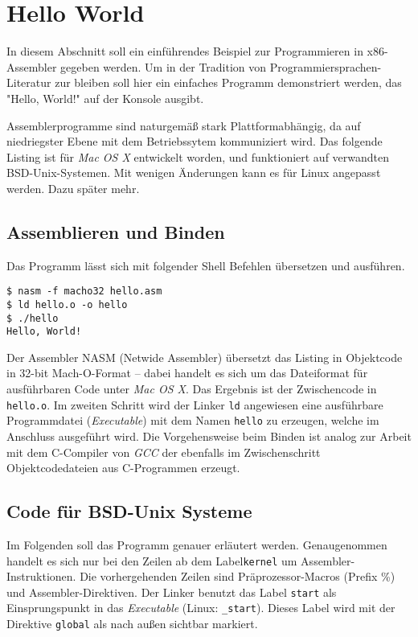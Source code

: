\section{Hello World}

In diesem Abschnitt soll ein einführendes Beispiel zur Programmieren in x86-Assembler gegeben werden. Um in der Tradition von Programmiersprachen-Literatur zur bleiben soll hier ein einfaches Programm demonstriert werden, das "Hello, World!" auf der Konsole ausgibt.

Assemblerprogramme sind naturgemäß stark Plattformabhängig, da auf niedriegster Ebene mit dem Betriebssytem kommuniziert wird.
Das folgende Listing ist für \emph{Mac OS X} entwickelt worden, und 
funktioniert auf verwandten BSD-Unix-Systemen. Mit wenigen Änderungen kann es für Linux angepasst werden. Dazu später mehr.

\subsection{Assemblieren und Binden}

Das Programm lässt sich mit folgender Shell Befehlen übersetzen und ausführen.

\begin{lstlisting}[caption=Assemblieren und Binden von hello.asm]
$ nasm -f macho32 hello.asm
$ ld hello.o -o hello
$ ./hello
Hello, World!
\end{lstlisting}

Der Assembler NASM (Netwide Assembler) übersetzt das Listing in Objektcode in 32-bit Mach-O-Format – dabei handelt es sich um das Dateiformat für ausführbaren Code unter \emph{Mac OS X}. Das Ergebnis ist der Zwischencode in \texttt{hello.o}. Im zweiten Schritt wird der Linker \texttt{ld} angewiesen eine ausführbare Programmdatei (\emph{Executable}) mit dem Namen \texttt{hello} zu erzeugen, welche im Anschluss ausgeführt wird. Die Vorgehensweise beim Binden ist analog zur Arbeit mit dem C-Compiler von \emph{GCC} der ebenfalls im Zwischenschritt Objektcodedateien aus C-Programmen erzeugt.

\subsection{Code für BSD-Unix Systeme}

Im Folgenden soll das Programm genauer erläutert werden. Genaugenommen handelt es sich nur bei den Zeilen ab dem Label\texttt{kernel} um Assembler-Instruktionen. Die vorhergehenden Zeilen sind Präprozessor-Macros (Prefix \%) und Assembler-Direktiven. Der Linker benutzt das Label {\tt start} als Einsprungspunkt in das \emph{Executable} (Linux: {\tt \_start}).
Dieses Label wird mit der Direktive {\tt global} als nach außen sichtbar markiert.

